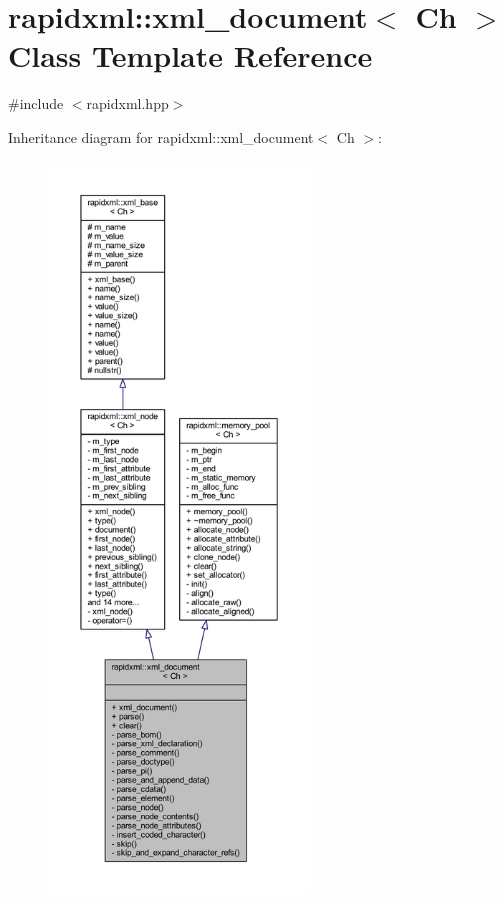 \hypertarget{singletonrapidxml_1_1xml__document}{\section{rapidxml\+:\+:xml\+\_\+document$<$ Ch $>$ Class Template Reference}
\label{singletonrapidxml_1_1xml__document}
}


{\ttfamily \#include $<$rapidxml.\+hpp$>$}



Inheritance diagram for rapidxml\+:\+:xml\+\_\+document$<$ Ch $>$\+:
\nopagebreak
\begin{figure}[H]
\begin{center}
\leavevmode
\includegraphics[height=550pt]{singletonrapidxml_1_1xml__document__inherit__graph}
\end{center}
\end{figure}


